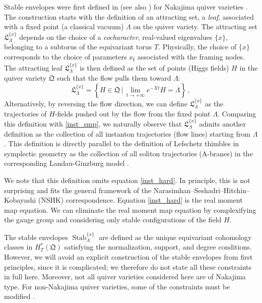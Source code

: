 \documentclass[10pt]{article}
\theoremstyle{definition}
\def\ff{\mathfrak{f}}
\def\fL{\mathfrak{L}}
\def\fQ{\mathfrak{Q}}
\def\lm{\limits}
\numberwithin{equation}{section}
\begin{document}
Stable envelopes were first defined in \cite{MO} (see also \cite{Aganagic:2021abc,okounkov2021inductive,okounkov2021nonabelian}) for Nakajima quiver varieties \cite{ginzburg2012lectures}.
The construction starts with the definition of an attracting set, a \emph{leaf}, associated with a fixed point (a classical vacuum) $\Lambda$ on the quiver variety.
The attracting set $\fL_{\Lambda}^{\{x\}}$ depends on the choice of a \emph{cocharacter}, real-valued eigenvalues $\{x\}$, belonging to a subtorus of the equivariant torus $T$.
Physically, the choice of $\{x\}$ corresponds to the choice of parameters $x_{\ff}$ associated with the framing nodes.
The attracting leaf $\fL_{\Lambda}^{\{x\}}$ is then defined as the set of points (Higgs fields) $H$ in the quiver variety $\fQ$ such that the flow pulls them toward $\Lambda$:
\begin{equation}
	\fL_{\Lambda}^{\{x\}}=\left\{H\in\fQ\,\bigg|\, \lim\lm_{t\to +\infty}e^{-X t}H=\Lambda \right\}\,,
\end{equation}
Alternatively, by reversing the flow direction, we can define $\fL_{\Lambda}^{\{x\}}$ as the trajectories of $H$-fields pushed out by the flow from the fixed point $\Lambda$.
Comparing this definition with \eqref{inst_smp}, we naturally observe that $\fL_{\Lambda}^{\{x\}}$ admits another definition as the collection of all instanton trajectories (flow lines) starting from $\Lambda$.
This definition is directly parallel to the definition of Lefschetz thimbles in symplectic geometry as the collection of all soliton trajectories (A-branes) in the corresponding Landau-Ginzburg model \cite{Gaiotto:2015aoa}.

We note that this definition omits equation \eqref{inst_hard}.
In principle, this is not surprising and fits the general framework of the Narasimhan--Seshadri--Hitchin--Kobayashi (NSHK) correspondence. 
Equation \eqref{inst_hard} is the real moment map equation.
We can eliminate the real moment map equation \cite{donaldson1983new,king1994moduli,Nakajima1994} by complexifying the gauge group and considering only stable configurations of the field $H$.

The stable envelopes $\operatorname{Stab}^{\{x\}}_{\Lambda}$ are defined as the unique equivariant cohomology classes in $H_T^*(\fQ)$ satisfying the normalization, support, and degree conditions.
However, we will avoid an explicit construction of the stable envelopes from first principles, since it is complicated; we therefore do not state all these constraints in full here.
Moreover, not all quiver varieties considered here are of Nakajima type.
For non-Nakajima quiver varieties, some of the constraints must be modified \cite{Ishtiaque:2023acr,Cao:2025yng,Cao:2026pir,Cao:2026vwf}.
\end{document}
